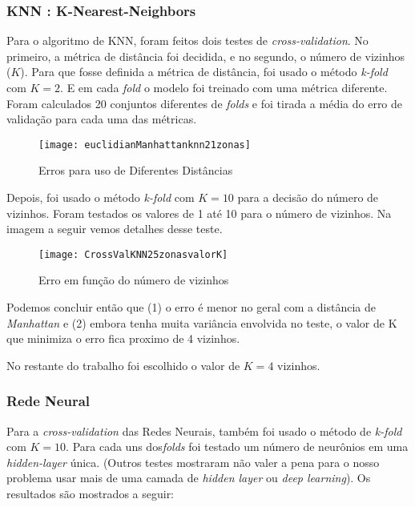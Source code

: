 \subsubsection{KNN : K-Nearest-Neighbors }


Para o algoritmo de KNN, foram feitos dois testes de \textit{cross-validation}. No primeiro, a métrica de distância foi decidida, e no segundo, o número de vizinhos ($K$).
Para que fosse definida a métrica de distância, foi usado o método  \textit{k-fold}  com $K=2$. E em cada \textit{fold} o modelo foi treinado com uma métrica diferente. Foram calculados 20 conjuntos diferentes de \textit{folds} e foi tirada a média do erro de validação para cada uma das métricas.


\begin{figure}[H]
\centering
\caption{Erros para uso de Diferentes Distâncias}
 \texttt{[image: euclidianManhattanknn21zonas]}
\label{fig:euclidian}
\end{figure}


Depois, foi usado o método  \textit{k-fold} com $K=10$ para a decisão do número de vizinhos. Foram testados os valores de 1 até 10 para o número de vizinhos. Na imagem a seguir vemos detalhes desse teste.


\begin{figure}[H]
\centering
\caption{Erro em função do número de vizinhos}
 \texttt{[image: CrossValKNN25zonasvalorK]}
\label{fig:crossValKNN}
\end{figure}



Podemos concluir então que (1) o erro é menor no geral com a distância de \textit{Manhattan} e (2) embora tenha muita variância envolvida no teste, o valor de K que minimiza o erro fica proximo de 4 vizinhos.


No restante do trabalho foi escolhido o valor de $K=4$ vizinhos.



\subsubsection{Rede Neural}

Para a \textit{cross-validation} das Redes Neurais, também foi usado o método de  \textit{k-fold} com $K=10$. Para cada uns dos\textit{folds} foi testado um número de neurônios em uma  \textit{hidden-layer} única. (Outros testes mostraram não valer a pena para o nosso problema usar mais de uma camada de  \textit{hidden layer} ou \textit{deep learning}). Os resultados são mostrados a seguir:



